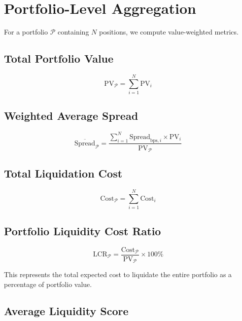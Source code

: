 \documentclass[11pt,a4paper]{article}
\begin{document}
\section{Portfolio-Level Aggregation}

For a portfolio $\mathcal{P}$ containing $N$ positions, we compute value-weighted metrics.

\subsection{Total Portfolio Value}

\begin{equation}
\text{PV}_{\mathcal{P}} = \sum_{i=1}^{N} \text{PV}_i
\end{equation}

\subsection{Weighted Average Spread}

\begin{equation}
\overline{\text{Spread}}_{\mathcal{P}} = \frac{\sum_{i=1}^{N} \text{Spread}_{\text{bps},i} \times \text{PV}_i}{\text{PV}_{\mathcal{P}}}
\end{equation}

\subsection{Total Liquidation Cost}

\begin{equation}
\text{Cost}_{\mathcal{P}} = \sum_{i=1}^{N} \text{Cost}_i
\end{equation}

\subsection{Portfolio Liquidity Cost Ratio}

\begin{equation}
\text{LCR}_{\mathcal{P}} = \frac{\text{Cost}_{\mathcal{P}}}{\text{PV}_{\mathcal{P}}} \times 100\%
\end{equation}

This represents the total expected cost to liquidate the entire portfolio as a percentage of portfolio value.

\subsection{Average Liquidity Score}
\end{document}
